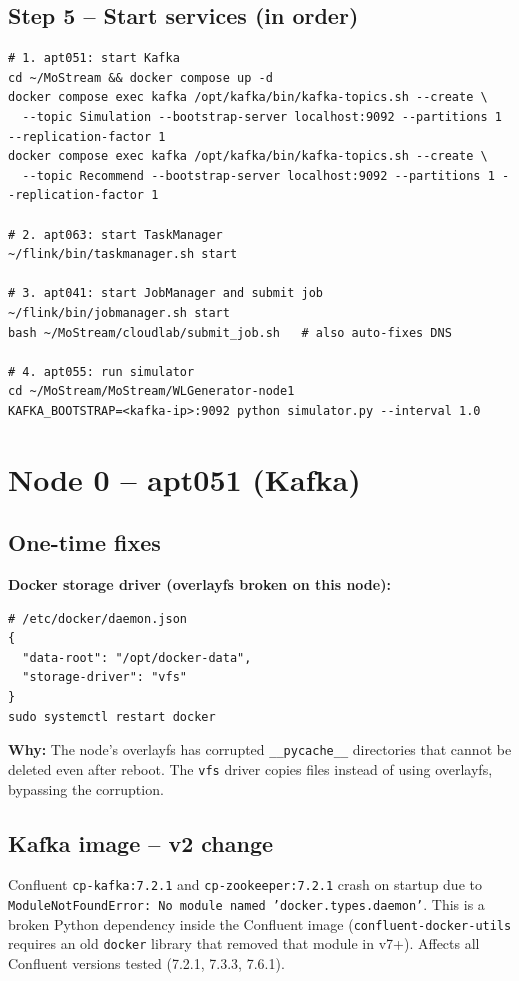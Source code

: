 \documentclass[11pt,a4paper]{article}
\begin{document}
\subsection{Step 5 -- Start services (in order)}
\begin{lstlisting}
# 1. apt051: start Kafka
cd ~/MoStream && docker compose up -d
docker compose exec kafka /opt/kafka/bin/kafka-topics.sh --create \
  --topic Simulation --bootstrap-server localhost:9092 --partitions 1 --replication-factor 1
docker compose exec kafka /opt/kafka/bin/kafka-topics.sh --create \
  --topic Recommend --bootstrap-server localhost:9092 --partitions 1 --replication-factor 1

# 2. apt063: start TaskManager
~/flink/bin/taskmanager.sh start

# 3. apt041: start JobManager and submit job
~/flink/bin/jobmanager.sh start
bash ~/MoStream/cloudlab/submit_job.sh   # also auto-fixes DNS

# 4. apt055: run simulator
cd ~/MoStream/MoStream/WLGenerator-node1
KAFKA_BOOTSTRAP=<kafka-ip>:9092 python simulator.py --interval 1.0
\end{lstlisting}

\section{Node 0 -- apt051 (Kafka)}

\subsection{One-time fixes}

\textbf{Docker storage driver (overlayfs broken on this node):}
\begin{lstlisting}
# /etc/docker/daemon.json
{
  "data-root": "/opt/docker-data",
  "storage-driver": "vfs"
}
sudo systemctl restart docker
\end{lstlisting}

\textbf{Why:} The node's overlayfs has corrupted \texttt{\_\_pycache\_\_} directories that
cannot be deleted even after reboot. The \texttt{vfs} driver copies files instead of using
overlayfs, bypassing the corruption.

\subsection{Kafka image -- v2 change}

Confluent \texttt{cp-kafka:7.2.1} and \texttt{cp-zookeeper:7.2.1} crash on startup due to
\texttt{ModuleNotFoundError: No module named 'docker.types.daemon'}. This is a broken Python
dependency inside the Confluent image (\texttt{confluent-docker-utils} requires an old
\texttt{docker} library that removed that module in v7+). Affects all Confluent versions tested
(7.2.1, 7.3.3, 7.6.1).
\end{document}
